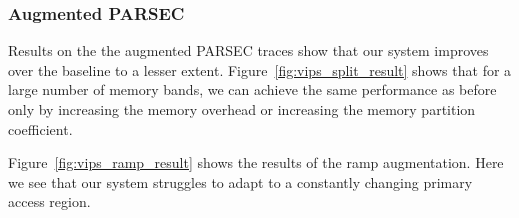 
\subsubsection{Augmented PARSEC}

Results on the the augmented PARSEC traces show that our system improves over the baseline to a lesser extent.
%
%
Figure~\ref{fig:vips_split_result} shows that for a large number of memory bands, we can achieve the same performance as before only by increasing the memory overhead or increasing the memory partition coefficient.

Figure~\ref{fig:vips_ramp_result} shows the results of the ramp augmentation. Here we see that our system struggles to adapt to a constantly changing primary access region. 



